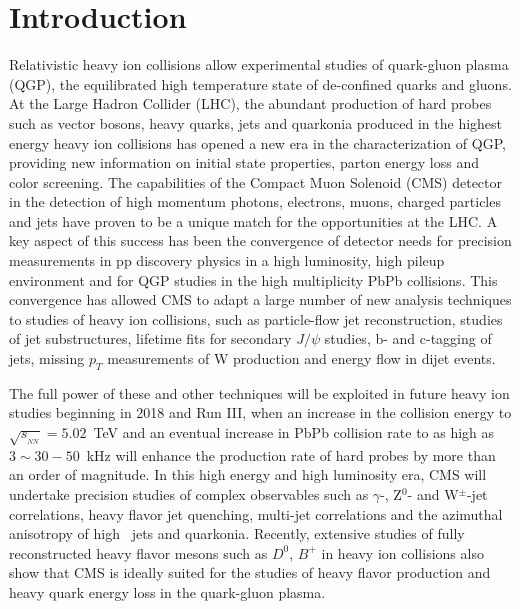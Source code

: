 \section{Introduction}
\label{sec:intro}

Relativistic heavy ion collisions allow experimental studies of quark-gluon plasma (QGP), the equilibrated high temperature state of de-confined quarks and gluons. At the Large Hadron Collider (LHC), the abundant production of hard probes such as vector bosons, heavy quarks, jets and quarkonia produced in the highest energy heavy ion collisions has opened a new era in the characterization of QGP, providing new information on initial state properties, parton energy loss and color screening. The capabilities of the Compact Muon Solenoid (CMS) detector in the detection of high momentum photons, electrons, muons, charged particles and jets have proven to be a unique match for the opportunities at the LHC. A key aspect of this success has been the convergence of detector needs for precision measurements in pp discovery physics in a high luminosity, high pileup environment and for QGP studies in the high multiplicity PbPb collisions. This convergence has allowed CMS to adapt a large number of new analysis techniques to studies of heavy ion collisions, such as particle-flow jet reconstruction, studies of jet substructures, lifetime fits for secondary $J/\psi$ studies,  b- and c-tagging of jets, missing $p_T$ measurements of W production and energy flow in dijet events. 

The full power of these and other techniques will be exploited in future heavy ion studies beginning in 2018 and Run III, when an increase in the collision energy to $\sqrt{s_{_{NN}}} = 5.02$~TeV and an eventual increase in PbPb collision rate to as high as $3\sim 30-50$~kHz will enhance the production rate of hard probes by more than an order of magnitude. In this high energy and high luminosity era, CMS will undertake precision studies of complex observables such as $\gamma$-, Z$^0$- and W$^\pm$-jet correlations, heavy flavor jet quenching, multi-jet correlations and the azimuthal anisotropy of high \pt\ jets and quarkonia. Recently, extensive studies of fully reconstructed heavy flavor mesons such as $D^0$, $B^+$ in heavy ion collisions also show that CMS is ideally suited for the studies of heavy flavor production and heavy quark energy loss in the quark-gluon plasma.

